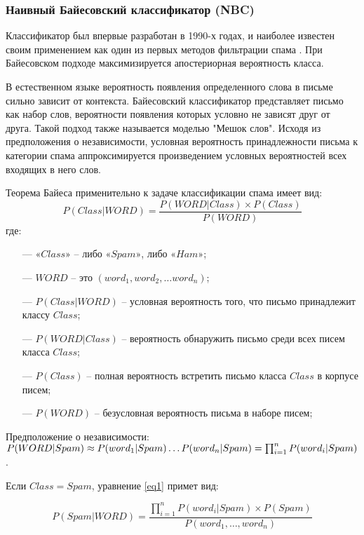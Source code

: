 \subsubsection{Наивный Байесовский классификатор (NBC)}
Классификатор был впервые разработан в 1990-х годах, и наиболее известен
своим применением как один из первых методов фильтрации спама \cite{Bayes}.
При Байесовском подходе максимизируется апостериорная вероятность класса.

В естественном языке вероятность появления определенного слова в письме
сильно зависит от контекста. Байесовский классификатор представляет письмо
как набор слов, вероятности появления которых условно не зависят друг от друга.
Такой подход также называется моделью "Мешок слов".
Исходя из предположения о независимости, условная вероятность принадлежности
письма к категории спама аппроксимируется произведением условных
вероятностей всех входящих в него слов.

Теорема Байеса применительно к задаче классификации спама имеет вид:
\begin{equation}\label{eq1}
    P(Class | WORD) = \frac{P(WORD | Class) \times P(Class)}{P(WORD)}
\end{equation}
где:
\begin{itemize}
    \item[—] ${«Class»}$ -- либо ${«Spam»}$, либо ${«Ham»}$;
    \item[—] ${WORD}$ -- это $({word_1}, {word_2}, \dots {word_n})$;
    \item[—] ${P(Class | WORD)}$ -- условная вероятность того, что письмо принадлежит классу ${Class}$;
    \item[—] ${P(WORD | Class)}$ -- вероятность обнаружить письмо среди всех писем класса ${Class}$;
    \item[—] ${P(Class)}$ -- полная вероятность встретить письмо класса ${Class}$ в корпусе писем;
    \item[—] ${P(WORD)}$ -- безусловная вероятность письма в наборе писем;
\end{itemize}

Предположение о независимости:
$P(WORD | Spam) \approx P(word_1 | Spam) \dots \\ P(word_n | Spam) = \prod_{i=1}^n P(word_i | Spam)$.

Если ${Class = Spam}$, уравнение \eqref{eq1} примет вид:


\begin{equation}\label{eq3}
    P(Spam | WORD) = \frac {\prod_{i=1}^n P(word_i | Spam) \times P(Spam)} {P(word_1, \dots ,word_n)}
\end{equation}



